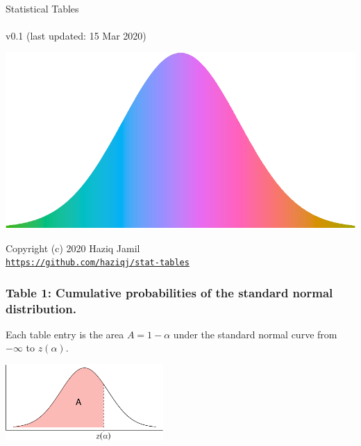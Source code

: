\documentclass[]{article}
\author{}
\date{\vspace{-2.5em}}
\begin{document}
\thispagestyle{empty}
\begin{center}
~\\
\vspace{2cm}
{\Huge Statistical Tables}
~\\~\\
v0.1 (last updated: 15 Mar 2020)
\vspace{5cm}
\end{center}

\begin{center}\includegraphics[width=\textwidth]{stat-tables_files/figure-latex/unnamed-chunk-1-1} \end{center}

\vfill
\begin{center}
Copyright (c) 2020 Haziq Jamil
~\\
\href{https://github.com/haziqj/stat-tables}{\texttt{https://github.com/haziqj/stat-tables}}
\end{center}

\newpage

\hypertarget{table-1-cumulative-probabilities-of-the-standard-normal-distribution.}{%
\subsubsection{Table 1: Cumulative probabilities of the standard normal
distribution.}\label{table-1-cumulative-probabilities-of-the-standard-normal-distribution.}}

Each table entry is the area \(A=1-\alpha\) under the standard normal
curve from \(-\infty\) to \(z(\alpha)\).

\vspace{1em}

\begin{center}\includegraphics[width=6cm]{stat-tables_files/figure-latex/unnamed-chunk-2-1} \end{center}
\end{document}

